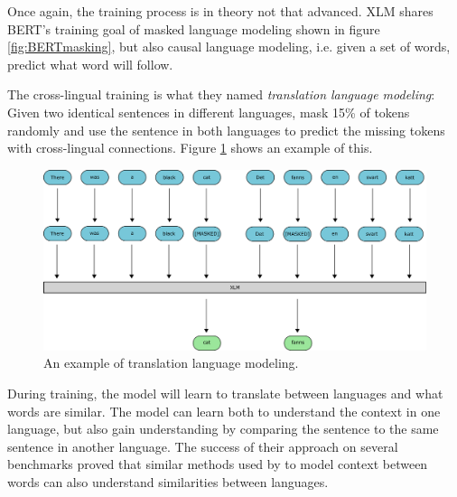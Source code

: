\documentclass[nofilelist]{cslthse-msc}
\begin{document}
Once again, the training process is in theory not that advanced. XLM shares BERT's training goal of masked language modeling shown in figure \ref{fig:BERTmasking}, but also causal language modeling, i.e. given a set of words, predict what word will follow. 

The cross-lingual training is what they named \emph{translation language modeling}: Given two identical sentences in different languages, mask 15\% of tokens randomly and use the sentence in both languages to predict the missing tokens with cross-lingual connections. Figure \ref{fig:TLM} shows an example of this.

\begin{figure}[ht]
    \centering
    \includegraphics[width=\textwidth]{LTMmasking.pdf}
    \caption{An example of translation language modeling.}
    \label{fig:TLM}
\end{figure}

During training, the model will learn to translate between languages and what words are similar. The model can learn both to understand the context in one language, but also gain understanding by comparing the sentence to the same sentence in another language. The success of their approach on several benchmarks proved that similar methods used by \citet{DBLP:journals/corr/abs-1810-04805} to model context between words can also understand similarities between languages.

\end{document}
